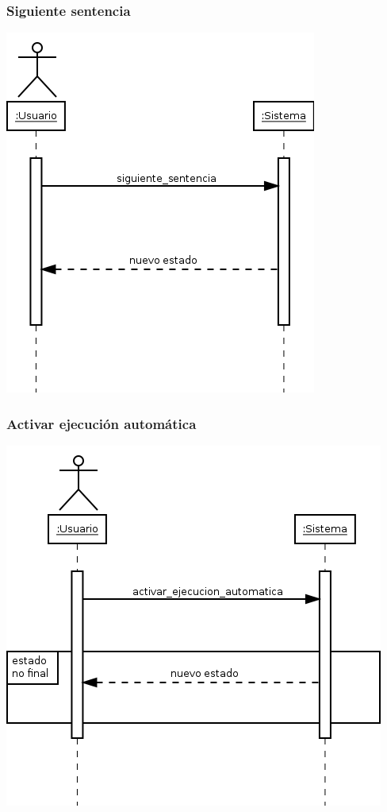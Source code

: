 \subsubsection{Siguiente sentencia}
\begin{center}
\includegraphics[scale=0.4]{siguiente_sentencia.png} \\
\end{center}
\subsubsection{Activar ejecución automática}
\begin{center}
\includegraphics[scale=0.4]{activar_ejecucion_automatica.png} \\
\end{center}
